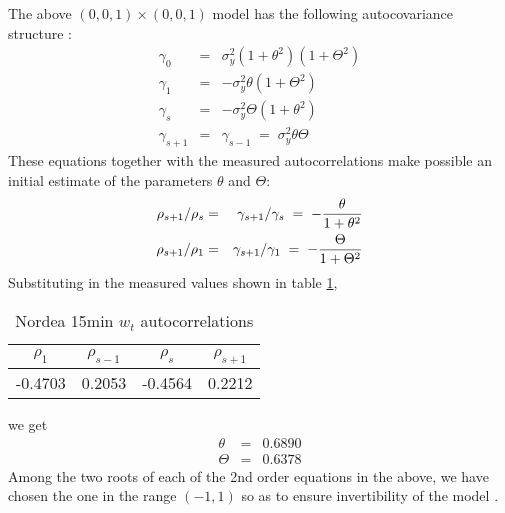 \documentclass{book}
\begin{document}
The above $(0, 0, 1)\times(0, 0, 1)$ model has the following
autocovariance structure \cite{BoxJenkins94}:
\begin{eqnarray*}
  \gamma_0 &=& \sigma_y^2 (1 + \theta^2)(1 + \Theta^2) \\
  \gamma_1 &=& -\sigma_y^2\theta(1 + \Theta^2) \\
  \gamma_s &=& -\sigma_y^2\Theta(1 + \theta^2) \\
  \gamma_{s+1} &=& \gamma_{s-1}\;=\;\sigma_y^2\theta\Theta
\end{eqnarray*}
These equations together with the measured autocorrelations make
possible an initial estimate of the parameters $\theta$ and $\Theta$:
\begin{eqnarray*}
  {\rho_{s+1}/\rho_s} &=& {\gamma_{s+1}/\gamma_s} \;=\; -{\theta \over
    1 + \theta^2} \\
  {\rho_{s+1}/\rho_1} &=& {\gamma_{s+1}/\gamma_1} \;=\; -{\Theta \over
    1 + \Theta^2} \\
\end{eqnarray*}
Substituting in the measured values shown in table
\ref{tab:nordea_15min_w_acf},
\begin{table}[htb!]
  \centering
  \begin{tabular}{c|c|c|c}
    $\rho_1$ & $\rho_{s-1}$ & $\rho_s$ & $\rho_{s+1}$ \\
    \hline
    -0.4703 &  0.2053 & -0.4564 &  0.2212
  \end{tabular}
  \caption{\footnotesize Nordea 15min $w_t$ autocorrelations}
  \label{tab:nordea_15min_w_acf}
\end{table}
we get
\begin{eqnarray*}
  \theta &=& 0.6890 \\
  \Theta &=& 0.6378
\end{eqnarray*}
Among the two roots of each of the 2nd order equations in the above,
we have chosen the one in the range $(-1, 1)$ so as to ensure
invertibility of the model \cite{BoxJenkins94}.
\end{document}
